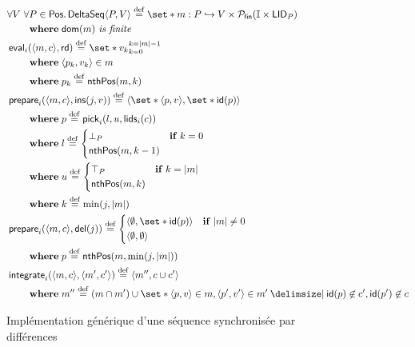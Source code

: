 \begin{figure}[htb]
    \centering
    \begin{align}
    &\begin{aligned}
    \MoveEqLeft\forall V\ \forall P \in \trm{Pos} \qsep \trm{DeltaSeq}\tuple*{P, V} \defeq \set*{m: P \pto V} \times \powerfset{\mathbb{I} \times \trm{LID}_P}\\
    &\where \trm{dom}(m)\ \textit{is finite}
    \end{aligned}\label{eq:deltaseq-state}\\
    &\begin{aligned}
    \MoveEqLeft \trm{eval}_i(\tuple*{m, c}, \trm{rd}) \defeq \set*{v_k}_{k=0}^{k=\card*{m} - 1}\\
    & \where \tuple*{p_k, v_k} \in m\\
    & \where p_k \defeq \trm{nthPos}(m, k)
    \end{aligned}\label{eq:deltaseq-eval}\\
    &\begin{aligned}
    \MoveEqLeft \trm{prepare}_i(\tuple*{m,c}, \trm{ins}(j, v)) \defeq%
    \tuple*{\set*{\tuple*{p, v}}, \set*{\trm{id}(p)}}\\
    &\where p \defeq \trm{pick}_i(l, u, \trm{lids}_i(c))\\
    &\where l \defeq \begin{dcases}
    \bot_P & \when k = 0\\
    \trm{nthPos}(m, k - 1) &
    \end{dcases}\label{eq:deltaseq-ins}\\
    &\where u \defeq \begin{dcases}
    \top_P & \when k = \card*{m}\\
    \trm{nthPos}(m, k) &
    \end{dcases}\\
    &\where k \defeq \min(j, \card*{m})
    \end{aligned}\\
    &\begin{aligned}
    \MoveEqLeft \trm{prepare}_i(\tuple*{m,c}, \trm{del}(j)) \defeq%
    \begin{dcases}
        \tuple*{\emptyset,\set*{\trm{id}(p)}} & \when \card*{m} \neq 0\\
        \tuple*{\emptyset,\emptyset} &
    \end{dcases}\\
    &\where p \defeq \trm{nthPos}(m, \min(j, \card*{m}))
    \end{aligned}\label{eq:deltaseq-del}\\
    &\begin{aligned}
    \MoveEqLeft \trm{integrate}_i(\tuple*{m,c}, \tuple*{m',c'}) \defeq \tuple*{m'',c \cup c'}\\
        &\where m'' \defeq (m \cap m') \cup \set*{\tuple*{p, v} \in m, \tuple*{p', v'} \in m' \given \trm{id}(p) \not\in c', \trm{id}(p') \not\in c}
    \end{aligned}\label{eq:deltaseq-integr}
    \end{align}
    \caption{Implémentation générique d'une séquence synchronisée par différences}\label{fig:deltaseq}
\end{figure}

